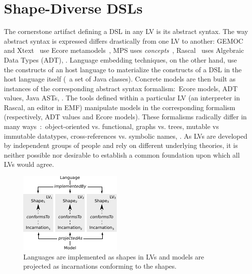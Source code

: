\section{Shape-Diverse DSLs}
\label{sec:shapes}

The cornerstone artifact defining a DSL in any LV is its abstract syntax.
The way abstract syntax is expressed differs drastically from one LV to another: GEMOC~\cite{bousse2016execution} and Xtext~\cite{bettini2016implementing} use Ecore metamodels~\cite{steinberg2008emf}, MPS uses \emph{concepts}~\cite{voelter2014generic}, Rascal~\cite{klint2010easy} uses Algebraic Data Types (ADT), \etc.
Language embedding techniques, on the other hand, use the constructs of an host language to materialize the constructs of a DSL in the host language itself (\eg~a set of Java classes).
Concrete models are then built as instances of the corresponding abstract syntax formalism:~Ecore models, ADT values, Java ASTs, \etc.
The tools defined within a particular LV (an interpreter in Rascal, an editor in EMF) manipulate models in the corresponding formalism (respectively, ADT values and Ecore models).
These formalisms radically differ in many ways~\cite{klint2016model}:~object-oriented vs. functional, graphs vs. trees, mutable vs immutable datatypes, cross-references vs. symbolic names, \etc.
As LVs are developed by independent groups of people and rely on different underlying theories, it is neither possible nor desirable to establish a common foundation upon which all LVs would agree.

\begin{figure}[bt]
	\centering
	\includegraphics[width=.7\columnwidth]{figures/shape-diverse-lang-3}
	\caption{Languages are implemented as shapes in LVs and models are projected as incarnations conforming to the shapes.}
	\label{fig:concepts}
\end{figure}

